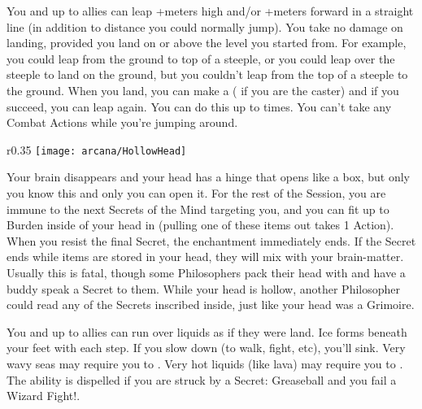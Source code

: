 \WIZARDRY[
  Name=Heroic Leap,
  Link=secrets-heroic-leap,
  Alignment=Biomancy,
  Save=N,
  Duration=0,
  Counter=None ,
  Keywords=None,
  Target=Self or Close Ally
]

You and up to  allies can leap +\SUMDICE meters high and/or +\SUMDICE meters forward in a straight line (in addition to distance you could normally jump).  You take no damage on landing, provided you land on or above the level you started from. For example, you could leap from the ground to top of a steeple, or you could leap over the steeple to land on the ground, but you couldn't leap from the top of a steeple to the ground.  When you land, you can make a \RSTRY{\DEX} (\RSTRY{\INT} if you are the caster) and if you succeed, you can leap again. You can do this up to \DICE times.  You can't take any Combat Actions while you're jumping around.

\WIZARDRY[
  Name=Hollow Head,
  Link=secrets-hollow-head,
  Alignment=Biomancy,
  Save=N,
  Duration=Session,
  Counter=None ,
  Keywords=Hammerspace,
  Target=Self
]


\begin{wrapfigure}[13]{r}{0.35\textwidth}
    \texttt{[image: arcana/HollowHead]}
\end{wrapfigure}


    Your brain disappears and your head has a hinge that opens like a box, but only you know this and only you can open it. For the rest of the Session,
    you are immune to the next \DICE Secrets of the Mind targeting you,  and you can fit up to \SUMDICE Burden inside of your head in  (pulling one of these items out takes 1 Action).  When you resist the final Secret, the enchantment immediately ends. If the Secret ends while items are stored in your head, they will mix with your brain-matter. Usually this is fatal, though some Philosophers pack their head with  and have a buddy speak a  Secret to them. While your head is hollow, another Philosopher could read any of the Secrets inscribed inside, just like your head was a Grimoire.

\newpage

\WIZARDRY[
  Name=Ice Bridge Step,
  Link=secrets-ice-bridge-step,
  Alignment=Elements,
  Save=N,
  Duration=Session,
  Counter=\mylink{Greaseball}{secrets-greaseball} ,
  Keywords=None,
  Target=Self
]

You and up to  allies can run over liquids as if they were land.  Ice forms beneath your feet with each step. If you slow down (to walk, fight,
etc), you'll sink. Very wavy seas may require you to \RSTRY{\DEX}.  Very hot liquids (like lava) may require you to \RSTRY{\INT}.  The ability is dispelled if you are struck by a Secret: Greaseball and you fail a Wizard Fight!.

